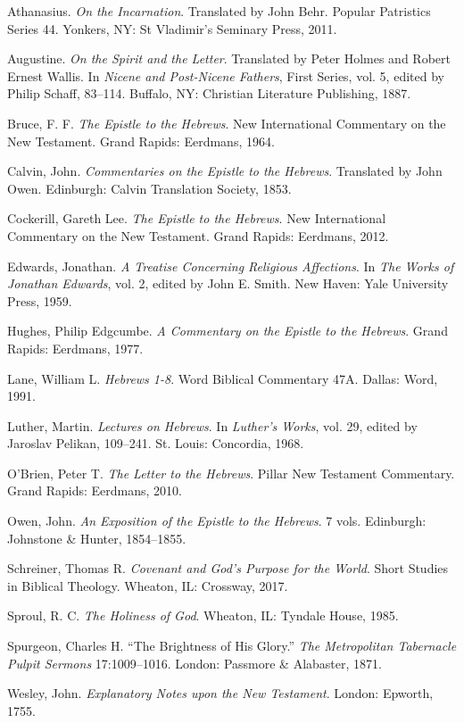 \documentclass[12pt]{article}
\begin{document}
\begin{thebibliography}{}
Athanasius. \emph{On the Incarnation}. Translated by John Behr. Popular
Patristics Series 44. Yonkers, NY: St Vladimir’s Seminary Press, 2011.

Augustine. \emph{On the Spirit and the Letter}. Translated by Peter Holmes and
Robert Ernest Wallis. In \emph{Nicene and Post-Nicene Fathers}, First Series,
vol. 5, edited by Philip Schaff, 83--114. Buffalo, NY: Christian Literature
Publishing, 1887.

Bruce, F. F. \emph{The Epistle to the Hebrews}. New International Commentary on
the New Testament. Grand Rapids: Eerdmans, 1964.

Calvin, John. \emph{Commentaries on the Epistle to the Hebrews}. Translated by
John Owen. Edinburgh: Calvin Translation Society, 1853.

Cockerill, Gareth Lee. \emph{The Epistle to the Hebrews}. New International
Commentary on the New Testament. Grand Rapids: Eerdmans, 2012.

Edwards, Jonathan. \emph{A Treatise Concerning Religious Affections}. In
\emph{The Works of Jonathan Edwards}, vol. 2, edited by John E. Smith. New
Haven: Yale University Press, 1959.

Hughes, Philip Edgcumbe. \emph{A Commentary on the Epistle to the Hebrews}.
Grand Rapids: Eerdmans, 1977.

Lane, William L. \emph{Hebrews 1-8}. Word Biblical Commentary 47A. Dallas: Word,
1991.

Luther, Martin. \emph{Lectures on Hebrews}. In \emph{Luther’s Works}, vol. 29,
edited by Jaroslav Pelikan, 109--241. St. Louis: Concordia, 1968.

O’Brien, Peter T. \emph{The Letter to the Hebrews}. Pillar New Testament
Commentary. Grand Rapids: Eerdmans, 2010.

Owen, John. \emph{An Exposition of the Epistle to the Hebrews}. 7 vols.
Edinburgh: Johnstone \& Hunter, 1854--1855.

Schreiner, Thomas R. \emph{Covenant and God’s Purpose for the World}. Short
Studies in Biblical Theology. Wheaton, IL: Crossway, 2017.

Sproul, R. C. \emph{The Holiness of God}. Wheaton, IL: Tyndale House, 1985.

Spurgeon, Charles H. ``The Brightness of His Glory.'' \emph{The Metropolitan
Tabernacle Pulpit Sermons} 17:1009--1016. London: Passmore \& Alabaster, 1871.

Wesley, John. \emph{Explanatory Notes upon the New Testament}. London: Epworth,
1755.
\end{thebibliography}
\end{document}
